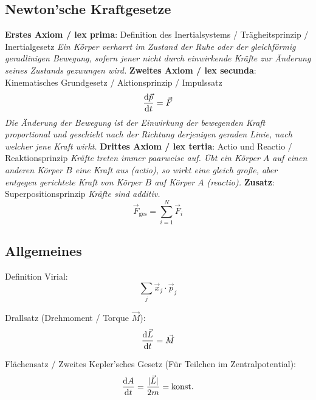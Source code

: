 \documentclass[11pt]{article}
\numberwithin{equation}{section}
\begin{document}
		\subsection{Newton'sche Kraftgesetze}
			\textbf{Erstes Axiom / lex prima}: Definition des Inertialsystems / Trägheitsprinzip / Inertialgesetz \newline
				\indent \textit{Ein Körper verharrt im Zustand der Ruhe oder der gleichförmig geradlinigen Bewegung, sofern jener nicht durch einwirkende Kräfte zur Änderung seines Zustands gezwungen wird.} \nl
			\textbf{Zweites Axiom / lex secunda}: Kinematisches Grundgesetz / Aktionsprinzip / Impulssatz
				\begin{equation}
					\frac{\mathrm{d} \vec{p}}{\mathrm{d} t} = \vec{F}
				\end{equation}
				\indent \textit{Die Änderung der Bewegung ist der Einwirkung der bewegenden Kraft proportional und geschieht nach der Richtung derjenigen geraden Linie, nach welcher jene Kraft wirkt.} \nl
			\textbf{Drittes Axiom / lex tertia}: Actio und Reactio / Reaktionsprinzip \newline
				\indent \textit{Kräfte treten immer paarweise auf. Übt ein Körper $A$ auf einen anderen Körper $B$ eine Kraft aus (actio), so wirkt eine gleich große, aber entgegen gerichtete Kraft von Körper $B$ auf Körper $A$ (reactio).} \nl
			\textbf{Zusatz}: Superpositionsprinzip \newline
				\indent \textit{Kräfte sind additiv.}
				\begin{equation}
					\vec{F}_{\mathrm{ges}} = \sum_{i=1}^{N} \vec{F}_i
				\end{equation}

		\subsection{Allgemeines}
			\noindent
			Definition Virial:
			\begin{equation}
				\sum_j \vec{x}_j\cdot\vec{p}_j
			\end{equation}

			\noindent
			Drallsatz (Drehmoment / Torque $\vec{M}$):
			\begin{equation}
				\frac{\mathrm{d} \vec{L}}{\mathrm{d} t} = \vec{M}
			\end{equation}

			\noindent
			Flächensatz / Zweites Kepler'sches Gesetz (Für Teilchen im Zentralpotential):
			\begin{equation}
				\frac{\mathrm{d} A}{\mathrm{d} t} = \frac{| \vec{L} |}{2 m} = \mathrm{konst.}
			\end{equation}
\end{document}
